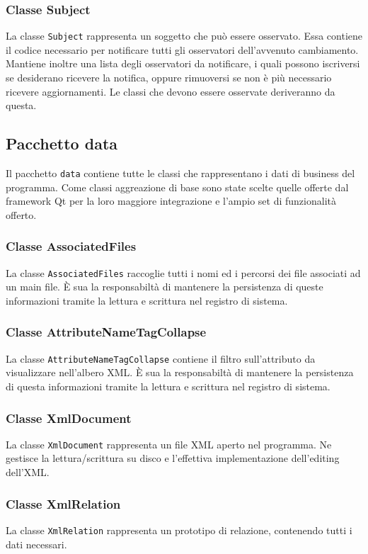 	\subsubsection{Classe Subject}
		La classe \texttt{Subject} rappresenta un soggetto che può essere osservato. Essa contiene il codice necessario per notificare tutti gli osservatori dell'avvenuto cambiamento. Mantiene inoltre una lista degli osservatori da notificare, i quali possono iscriversi se desiderano ricevere la notifica, oppure rimuoversi se non è più necessario ricevere aggiornamenti. Le classi che devono essere osservate deriveranno da questa.

\subsection{Pacchetto data}
	Il pacchetto \texttt{data} contiene tutte le classi che rappresentano i dati di business del programma. Come classi aggreazione di base sono state scelte quelle offerte dal framework Qt per la loro maggiore integrazione e l'ampio set di funzionalità offerto.

	\subsubsection{Classe AssociatedFiles}
		La classe \texttt{AssociatedFiles} raccoglie tutti i nomi ed i percorsi dei file associati ad un main file. È sua la responsabiltà di mantenere la persistenza di queste informazioni tramite la lettura e scrittura nel registro di sistema.
	
	\subsubsection{Classe AttributeNameTagCollapse}
		La classe \texttt{AttributeNameTagCollapse} contiene il filtro sull'attributo da visualizzare nell'albero XML. È sua la responsabiltà di mantenere la persistenza di questa informazioni tramite la lettura e scrittura nel registro di sistema.
		
	\subsubsection{Classe XmlDocument}
		La classe \texttt{XmlDocument} rappresenta un file XML aperto nel programma. Ne gestisce la lettura/scrittura su disco e l'effettiva implementazione dell'editing dell'XML.

	\subsubsection{Classe XmlRelation}
		La classe \texttt{XmlRelation} rappresenta un prototipo di relazione, contenendo tutti i dati necessari.
		
